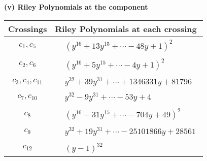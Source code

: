 \documentclass[1p]{elsarticle_modified}
\theoremstyle{definition}
\begin{document}
\newpage\renewcommand{\arraystretch}{1}
\flushleft \textbf{(v) Riley Polynomials at the component}\newline \\
\begin{tabular}{m{50pt}|m{274pt}}
Crossings & \hspace{64pt}Riley Polynomials at each crossing \\
\hline $$\begin{aligned}c_{1},c_{5}\end{aligned}$$&$\begin{aligned}
&(y^{16}+13 y^{15}+\cdots-48 y+1)^{2}
\end{aligned}$\\
\hline $$\begin{aligned}c_{2},c_{6}\end{aligned}$$&$\begin{aligned}
&(y^{16}+5 y^{15}+\cdots-4 y+1)^{2}
\end{aligned}$\\
\hline $$\begin{aligned}c_{3},c_{4},c_{11}\end{aligned}$$&$\begin{aligned}
&y^{32}+39 y^{31}+\cdots+1346331 y+81796
\end{aligned}$\\
\hline $$\begin{aligned}c_{7},c_{10}\end{aligned}$$&$\begin{aligned}
&y^{32}-9 y^{31}+\cdots-53 y+4
\end{aligned}$\\
\hline $$\begin{aligned}c_{8}\end{aligned}$$&$\begin{aligned}
&(y^{16}-31 y^{15}+\cdots-704 y+49)^{2}
\end{aligned}$\\
\hline $$\begin{aligned}c_{9}\end{aligned}$$&$\begin{aligned}
&y^{32}+19 y^{31}+\cdots-25101866 y+28561
\end{aligned}$\\
\hline $$\begin{aligned}c_{12}\end{aligned}$$&$\begin{aligned}
&(y-1)^{32}
\end{aligned}$\\
\hline
\end{tabular}\\~\\
\end{document}
